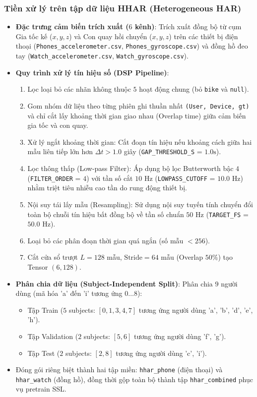 \subsubsection{Tiền xử lý trên tập dữ liệu HHAR (Heterogeneous HAR)}
\begin{itemize}
    \item \textbf{Đặc trưng cảm biến trích xuất ($6$ kênh)}: 
    Trích xuất đồng bộ từ cụm Gia tốc kế ($x, y, z$) và Con quay hồi chuyển ($x, y, z$) trên các thiết bị điện thoại (\texttt{Phones\_accelerometer.csv}, \texttt{Phones\_gyroscope.csv}) và đồng hồ đeo tay (\texttt{Watch\_accelerometer.csv}, \texttt{Watch\_gyroscope.csv}).
    \item \textbf{Quy trình xử lý tín hiệu số (DSP Pipeline)}:
    \begin{enumerate}
        \item Lọc loại bỏ các nhãn không thuộc $5$ hoạt động chung (bỏ \texttt{bike} và \texttt{null}).
        \item Gom nhóm dữ liệu theo từng phiên ghi thuần nhất \texttt{(User, Device, gt)} và chỉ cắt lấy khoảng thời gian giao nhau (Overlap time) giữa cảm biến gia tốc và con quay.
        \item Xử lý ngắt khoảng thời gian: Cắt đoạn tín hiệu nếu khoảng cách giữa hai mẫu liên tiếp lớn hơn $\Delta t > 1.0$ giây (\texttt{GAP\_THRESHOLD\_S} = $1.0\text{s}$).
        \item Lọc thông thấp (Low-pass Filter): Áp dụng bộ lọc Butterworth bậc $4$ (\texttt{FILTER\_ORDER} = $4$) với tần số cắt $10\text{ Hz}$ (\texttt{LOWPASS\_CUTOFF} = $10.0\text{ Hz}$) nhằm triệt tiêu nhiễu cao tần do rung động thiết bị.
        \item Nội suy tái lấy mẫu (Resampling): Sử dụng nội suy tuyến tính chuyển đổi toàn bộ chuỗi tín hiệu bất đồng bộ về tần số chuẩn $50\text{ Hz}$ (\texttt{TARGET\_FS} = $50.0\text{ Hz}$).
        \item Loại bỏ các phân đoạn thời gian quá ngắn (số mẫu $< 256$).
        \item Cắt cửa sổ trượt $L = 128$ mẫu, $\text{Stride} = 64$ mẫu (Overlap $50\%$) tạo Tensor $(6, 128)$.
    \end{enumerate}
    \item \textbf{Phân chia dữ liệu (Subject-Independent Split)}: Phân chia $9$ người dùng (mã hóa 'a' đến 'i' tương ứng $0 \dots 8$):
    \begin{itemize}
        \item Tập Train ($5$ subjects: $[0, 1, 3, 4, 7]$ tương ứng người dùng 'a', 'b', 'd', 'e', 'h').
        \item Tập Validation ($2$ subjects: $[5, 6]$ tương ứng người dùng 'f', 'g').
        \item Tập Test ($2$ subjects: $[2, 8]$ tương ứng người dùng 'c', 'i').
    \end{itemize}
    \item Đóng gói riêng biệt thành hai tập miền: \texttt{hhar\_phone} (điện thoại) và \texttt{hhar\_watch} (đồng hồ), đồng thời gộp toàn bộ thành tập \texttt{hhar\_combined} phục vụ pretrain SSL.
\end{itemize}

